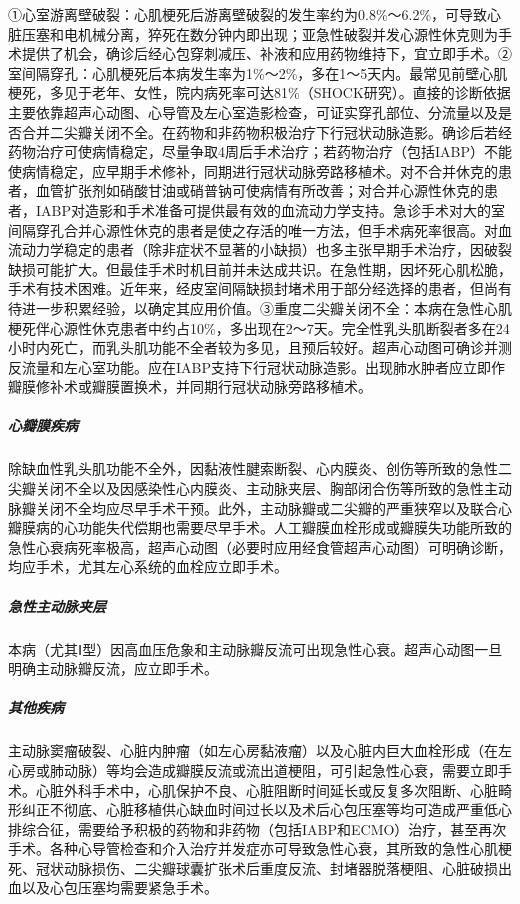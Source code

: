 ①心室游离壁破裂：心肌梗死后游离壁破裂的发生率约为0.8\%～6.2\%，可导致心脏压塞和电机械分离，猝死在数分钟内即出现；亚急性破裂并发心源性休克则为手术提供了机会，确诊后经心包穿刺减压、补液和应用药物维持下，宜立即手术。②室间隔穿孔：心肌梗死后本病发生率为1\%～2\%，多在1～5天内。最常见前壁心肌梗死，多见于老年、女性，院内病死率可达81\%（SHOCK研究）。直接的诊断依据主要依靠超声心动图、心导管及左心室造影检查，可证实穿孔部位、分流量以及是否合并二尖瓣关闭不全。在药物和非药物积极治疗下行冠状动脉造影。确诊后若经药物治疗可使病情稳定，尽量争取4周后手术治疗；若药物治疗（包括IABP）不能使病情稳定，应早期手术修补，同期进行冠状动脉旁路移植术。对不合并休克的患者，血管扩张剂如硝酸甘油或硝普钠可使病情有所改善；对合并心源性休克的患者，IABP对造影和手术准备可提供最有效的血流动力学支持。急诊手术对大的室间隔穿孔合并心源性休克的患者是使之存活的唯一方法，但手术病死率很高。对血流动力学稳定的患者（除非症状不显著的小缺损）也多主张早期手术治疗，因破裂缺损可能扩大。但最佳手术时机目前并未达成共识。在急性期，因坏死心肌松脆，手术有技术困难。近年来，经皮室间隔缺损封堵术用于部分经选择的患者，但尚有待进一步积累经验，以确定其应用价值。③重度二尖瓣关闭不全：本病在急性心肌梗死伴心源性休克患者中约占10\%，多出现在2～7天。完全性乳头肌断裂者多在24小时内死亡，而乳头肌功能不全者较为多见，且预后较好。超声心动图可确诊并测反流量和左心室功能。应在IABP支持下行冠状动脉造影。出现肺水肿者应立即作瓣膜修补术或瓣膜置换术，并同期行冠状动脉旁路移植术。

\subparagraph{心瓣膜疾病}

除缺血性乳头肌功能不全外，因黏液性腱索断裂、心内膜炎、创伤等所致的急性二尖瓣关闭不全以及因感染性心内膜炎、主动脉夹层、胸部闭合伤等所致的急性主动脉瓣关闭不全均应尽早手术干预。此外，主动脉瓣或二尖瓣的严重狭窄以及联合心瓣膜病的心功能失代偿期也需要尽早手术。人工瓣膜血栓形成或瓣膜失功能所致的急性心衰病死率极高，超声心动图（必要时应用经食管超声心动图）可明确诊断，均应手术，尤其左心系统的血栓应立即手术。

\subparagraph{急性主动脉夹层}

本病（尤其Ⅰ型）因高血压危象和主动脉瓣反流可出现急性心衰。超声心动图一旦明确主动脉瓣反流，应立即手术。

\subparagraph{其他疾病}

主动脉窦瘤破裂、心脏内肿瘤（如左心房黏液瘤）以及心脏内巨大血栓形成（在左心房或肺动脉）等均会造成瓣膜反流或流出道梗阻，可引起急性心衰，需要立即手术。心脏外科手术中，心肌保护不良、心脏阻断时间延长或反复多次阻断、心脏畸形纠正不彻底、心脏移植供心缺血时间过长以及术后心包压塞等均可造成严重低心排综合征，需要给予积极的药物和非药物（包括IABP和ECMO）治疗，甚至再次手术。各种心导管检查和介入治疗并发症亦可导致急性心衰，其所致的急性心肌梗死、冠状动脉损伤、二尖瓣球囊扩张术后重度反流、封堵器脱落梗阻、心脏破损出血以及心包压塞均需要紧急手术。

